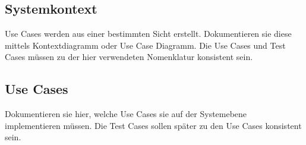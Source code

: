 \subsection{Systemkontext}

Use Cases werden aus einer bestimmten Sicht erstellt. Dokumentieren sie
diese mittels Kontextdiagramm oder Use Case Diagramm. Die Use Cases und
Test Cases müssen zu der hier verwendeten Nomenklatur konsistent sein.

\subsection{Use Cases}

Dokumentieren sie hier, welche Use Cases sie auf der Systemebene
implementieren müssen. Die Test Cases sollen später zu den Use Cases
konsistent sein.

